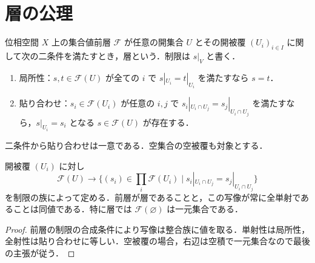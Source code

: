 \section{層の公理}
\begin{defn}[集合値層]
位相空間 $X$ 上の集合値前層 $\mathcal F$ が任意の開集合 $U$ とその開被覆 $(U_i)_{i\in I}$ に関して次の二条件を満たすとき，層という．制限は $s|_V$ と書く．
\begin{enumerate}
\item 局所性：$s,t\in\mathcal F(U)$ が全ての $i$ で $s|_{U_i}=t|_{U_i}$ を満たすなら $s=t$．
\item 貼り合わせ：$s_i\in\mathcal F(U_i)$ が任意の $i,j$ で $s_i|_{U_i\cap U_j}=s_j|_{U_i\cap U_j}$ を満たすなら，$s|_{U_i}=s_i$ となる $s\in\mathcal F(U)$ が存在する．
\end{enumerate}
二条件から貼り合わせは一意である．空集合の空被覆も対象とする．
\end{defn}
\begin{prop}[整合族による層の判定]
開被覆 $(U_i)$ に対し
\[
 \mathcal F(U)\longrightarrow
 \{(s_i)\in\prod_i\mathcal F(U_i)\mid
 s_i|_{U_i\cap U_j}=s_j|_{U_i\cap U_j}\}
\]
を制限の族によって定める．前層が層であることと，この写像が常に全単射であることは同値である．特に層では $\mathcal F(\varnothing)$ は一元集合である．
\end{prop}
\begin{proof}
前層の制限の合成条件により写像は整合族に値を取る．単射性は局所性，全射性は貼り合わせに等しい．空被覆の場合，右辺は空積で一元集合なので最後の主張が従う．
\end{proof}
